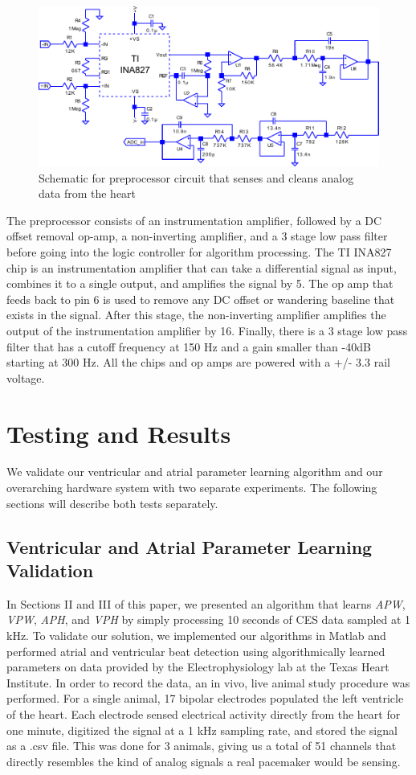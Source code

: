 \documentclass[conference]{IEEEtran}
\newcommand{\APW}{\textit{APW}}
\newcommand{\VPW}{\textit{VPW}}
\newcommand{\APH}{\textit{APH}}
\newcommand{\VPH}{\textit{VPH}}
\begin{document}
\begin{figure}[h]
	\centering
	\includegraphics[width=.9\columnwidth]{schematic.pdf}
	\caption{Schematic for preprocessor circuit that senses and cleans analog data from the heart}
	\label{fig:schematic}
\end{figure}

The preprocessor consists of an instrumentation
amplifier, followed by a DC offset removal op-amp, a
non-inverting amplifier, and a 3 stage low pass filter
before going into the logic controller for algorithm
processing. The TI INA827 chip is an instrumentation
amplifier that can take a differential signal as input,
combines it to a single output, and amplifies the signal
by 5. The op amp that feeds back to pin 6 is used to
remove any DC offset or wandering baseline that exists
in the signal. After this stage, the non-inverting amplifier
amplifies the output of the instrumentation amplifier by
16. Finally, there is a 3 stage low pass filter that has a
cutoff frequency at 150 Hz and a gain smaller than -40dB 
starting at 300 Hz. All the chips and op amps are
powered with a +/- 3.3 rail voltage.

\section{Testing and Results}
We validate our ventricular and atrial parameter
learning algorithm and our overarching hardware system
with two separate experiments. The following sections
will describe both tests separately.

\subsection{Ventricular and Atrial Parameter Learning Validation}
In Sections II and III of this paper, we presented an
algorithm that learns \APW{}, \VPW{}, \APH{}, and \VPH{} by
simply processing 10 seconds of CES data sampled at 1
kHz. To validate our solution, we implemented our algorithms in
Matlab and performed atrial and ventricular beat
detection using algorithmically learned parameters on
data provided by the Electrophysiology lab at the Texas Heart Institute.
In order to record the data, an in vivo,
live animal study procedure was performed. For a single
animal, 17 bipolar electrodes populated the left ventricle
of the heart. Each electrode sensed electrical activity
directly from the heart for one minute, digitized the
signal at a 1 kHz sampling rate, and stored the signal as
a .csv file. This was done for 3 animals, giving us a total
of 51 channels that directly resembles the kind of analog
signals a real pacemaker would be sensing.
\end{document}
